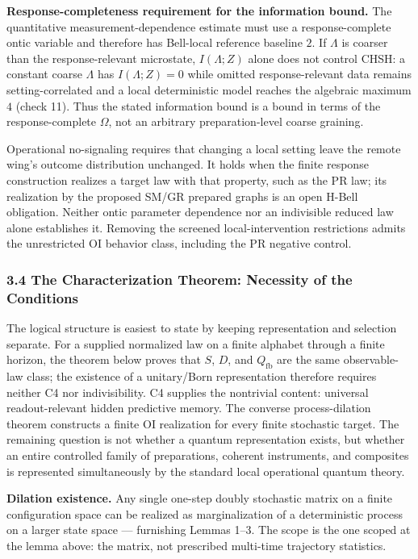 \documentclass[
]{article}
\begin{document}
\textbf{Response-completeness requirement for the information bound.}
The quantitative measurement-dependence estimate must use a
response-complete ontic variable and therefore has Bell-local reference
baseline \(2\). If \(\Lambda\) is coarser than the response-relevant
microstate, \(I(\Lambda;Z)\) alone does not control CHSH: a constant
coarse \(\Lambda\) has \(I(\Lambda;Z)=0\) while omitted
response-relevant data remains setting-correlated and a local
deterministic model reaches the algebraic maximum \(4\) (check 11). Thus
the stated information bound is a bound in terms of the
response-complete \(\Omega\), not an arbitrary preparation-level coarse
graining.

Operational no-signaling requires that changing a local setting leave
the remote wing's outcome distribution unchanged. It holds when the
finite response construction realizes a target law with that property,
such as the PR law; its realization by the proposed SM/GR prepared
graphs is an open H-Bell obligation. Neither ontic parameter dependence
nor an indivisible reduced law alone establishes it. Removing the
screened local-intervention restrictions admits the unrestricted OI
behavior class, including the PR negative control.

\hypertarget{the-characterization-theorem-necessity-of-the-conditions}{%
\subsubsection{3.4 The Characterization Theorem: Necessity of the
Conditions}\label{the-characterization-theorem-necessity-of-the-conditions}}

The logical structure is easiest to state by keeping representation and
selection separate. For a supplied normalized law on a finite alphabet
through a finite horizon, the theorem below proves that \(S\), \(D\),
and \(Q_{\mathrm{fb}}\) are the same observable-law class; the existence
of a unitary/Born representation therefore requires neither C4 nor
indivisibility. C4 supplies the nontrivial content: universal
readout-relevant hidden predictive memory. The converse process-dilation
theorem constructs a finite OI realization for every finite stochastic
target. The remaining question is not whether a quantum representation
exists, but whether an entire controlled family of preparations,
coherent instruments, and composites is represented simultaneously by
the standard local operational quantum theory.

\textbf{Dilation existence.} Any single one-step doubly stochastic
matrix on a finite configuration space can be realized as
marginalization of a deterministic process on a larger state space ---
furnishing Lemmas 1--3. The scope is the one scoped at the lemma above:
the matrix, not prescribed multi-time trajectory statistics.
\end{document}
